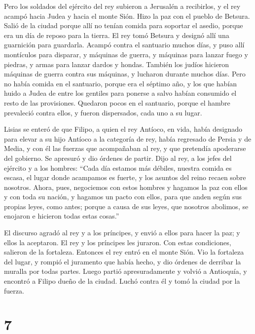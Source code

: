  Pero los soldados del ejército del rey subieron a
Jerusalén a recibirlos, y el rey acampó hacia Judea y hacia el monte
Sión.  Hizo la paz con el pueblo de Betsura. Salió de la
ciudad porque allí no tenían comida para soportar el asedio, porque era
un día de reposo para la tierra.  El rey tomó Betsura y
designó allí una guarnición para guardarla.  Acampó
contra el santuario muchos días, y puso allí montículos para disparar, y
máquinas de guerra, y máquinas para lanzar fuego y piedras, y armas para
lanzar dardos y hondas.  También los judíos hicieron
máquinas de guerra contra sus máquinas, y lucharon durante muchos días.
 Pero no había comida en el santuario, porque era el
séptimo año, y los que habían huido a Judea de entre los gentiles para
ponerse a salvo habían consumido el resto de las provisiones.
 Quedaron pocos en el santuario, porque el hambre
prevaleció contra ellos, y fueron dispersados, cada uno a su lugar.

 Lisias se enteró de que Filipo, a quien el rey Antíoco,
en vida, había designado para elevar a su hijo Antíoco a la categoría de
rey,  había regresado de Persia y de Media, y con él las
fuerzas que acompañaban al rey, y que pretendía apoderarse del gobierno.
 Se apresuró y dio órdenes de partir. Dijo al rey, a los
jefes del ejército y a los hombres: ``Cada día estamos más débiles,
nuestra comida es escasa, el lugar donde acampamos es fuerte, y los
asuntos del reino recaen sobre nosotros.  Ahora, pues,
negociemos con estos hombres y hagamos la paz con ellos y con toda su
nación,  y hagamos un pacto con ellos, para que anden
según sus propias leyes, como antes; porque a causa de sus leyes, que
nosotros abolimos, se enojaron e hicieron todas estas cosas.''

 El discurso agradó al rey y a los príncipes, y envió a
ellos para hacer la paz; y ellos la aceptaron.  El rey y
los príncipes les juraron. Con estas condiciones, salieron de la
fortaleza.  Entonces el rey entró en el monte Sión. Vio
la fortaleza del lugar, y rompió el juramento que había hecho, y dio
órdenes de derribar la muralla por todas partes.  Luego
partió apresuradamente y volvió a Antioquía, y encontró a Filipo dueño
de la ciudad. Luchó contra él y tomó la ciudad por la fuerza.

\hypertarget{section-6}{%
\section{7}\label{section-6}}

